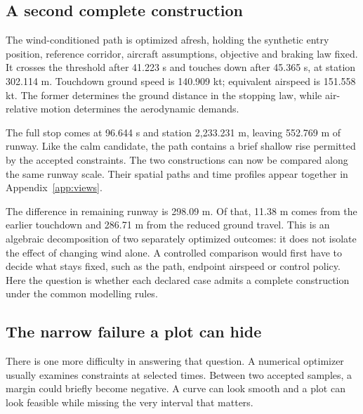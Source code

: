 \FloatBarrier
\subsection*{A second complete construction}
The wind-conditioned path is optimized afresh, holding the synthetic entry position, reference corridor, aircraft assumptions, objective and braking law fixed. It crosses the threshold after 41.223 s and touches down after 45.365 s, at station 302.114 m. Touchdown ground speed is 140.909 kt; equivalent airspeed is 151.558 kt. The former determines the ground distance in the stopping law, while air-relative motion determines the aerodynamic demands.

The full stop comes at 96.644 s and station 2,233.231 m, leaving 552.769 m of runway. Like the calm candidate, the path contains a brief shallow rise permitted by the accepted constraints. The two constructions can now be compared along the same runway scale. Their spatial paths and time profiles appear together in Appendix~\ref{app:views}.


The difference in remaining runway is 298.09 m. Of that, 11.38 m comes from the earlier touchdown and 286.71 m from the reduced ground travel. This is an algebraic decomposition of two separately optimized outcomes: it does not isolate the effect of changing wind alone. A controlled comparison would first have to decide what stays fixed, such as the path, endpoint airspeed or control policy. Here the question is whether each declared case admits a complete construction under the common modelling rules.

\subsection*{The narrow failure a plot can hide}
There is one more difficulty in answering that question. A numerical optimizer usually examines constraints at selected times. Between two accepted samples, a margin could briefly become negative. A curve can look smooth and a plot can look feasible while missing the very interval that matters.

